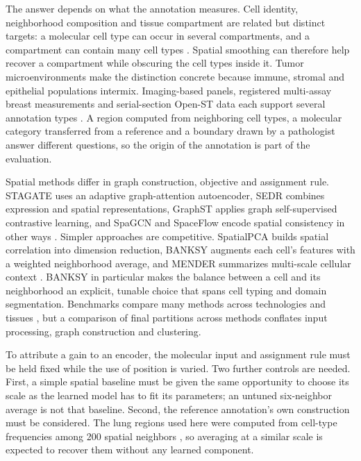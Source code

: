 \documentclass[11pt]{article}
\begin{document}
The answer depends on what the annotation measures. Cell identity, neighborhood composition and tissue compartment are related but distinct targets: a molecular cell type can occur in several compartments, and a compartment can contain many cell types \citep{moses2022museum,rao2021architecture}. Spatial smoothing can therefore help recover a compartment while obscuring the cell types inside it. Tumor microenvironments make the distinction concrete because immune, stromal and epithelial populations intermix. Imaging-based panels, registered multi-assay breast measurements and serial-section Open-ST data each support several annotation types \citep{he2022cosmx,janesick2023breast,schott2024openst}. A region computed from neighboring cell types, a molecular category transferred from a reference and a boundary drawn by a pathologist answer different questions, so the origin of the annotation is part of the evaluation.

Spatial methods differ in graph construction, objective and assignment rule. STAGATE uses an adaptive graph-attention autoencoder, SEDR combines expression and spatial representations, GraphST applies graph self-supervised contrastive learning, and SpaGCN and SpaceFlow encode spatial consistency in other ways \citep{dong2022stagate,xu2024sedr,long2023graphst,hu2021spagcn,ren2022spaceflow}. Simpler approaches are competitive. SpatialPCA builds spatial correlation into dimension reduction, BANKSY augments each cell's features with a weighted neighborhood average, and MENDER summarizes multi-scale cellular context \citep{shang2022spatialpca,singhal2024banksy,yuan2024mender}. BANKSY in particular makes the balance between a cell and its neighborhood an explicit, tunable choice that spans cell typing and domain segmentation. Benchmarks compare many methods across technologies and tissues \citep{yuan2024benchmark,kang2025nar,chen2025imeta}, but a comparison of final partitions across methods conflates input processing, graph construction and clustering.

To attribute a gain to an encoder, the molecular input and assignment rule must be held fixed while the use of position is varied. Two further controls are needed. First, a simple spatial baseline must be given the same opportunity to choose its scale as the learned model has to fit its parameters; an untuned six-neighbor average is not that baseline. Second, the reference annotation's own construction must be considered. The lung regions used here were computed from cell-type frequencies among 200 spatial neighbors \citep{he2022cosmx,sun2026consensus}, so averaging at a similar scale is expected to recover them without any learned component.
\end{document}

